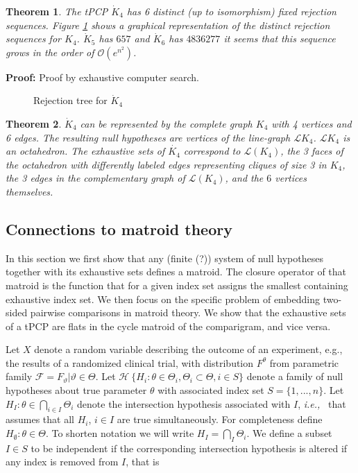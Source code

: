 \documentclass[a4paper,12pt]{article}
\newtheorem{theorem}{Theorem}
\newenvironment{proof}[1][Proof]{\noindent\textbf{#1:} }{}
\newcommand{\ie}{{\em i.e.,}~}
\begin{document}
\begin{theorem}
  The tPCP $\dot{K}_4$ has 6 distinct (up to isomorphism) fixed
  rejection sequences. Figure \ref{fig:k4} shows a graphical
  representation of the distinct rejection sequences for
  $K_4$. $\dot{K}_5$ has $657$ and $\dot{K}_6$ has $4836277$ it seems
  that this sequence grows in the order of $\mathcal{O}(e^{n^2})$.
\end{theorem}

\begin{proof}
  Proof by exhaustive computer search.
\end{proof}

\begin{figure}

  \caption{Rejection tree for $\dot{K}_4$}
  \label{fig:k4}
\end{figure}

\begin{theorem}
  $\dot{K}_4$ can be represented by the complete graph $K_4$ with 4
  vertices and 6 edges. The resulting null hypotheses are vertices of
  the line-graph $\mathcal{L}{K_4}$. $\mathcal{L}{K_4}$ is an
  octahedron. The exhaustive sets of $\dot{K_4}$ correspond to
  $\mathcal{L}(K_4)$, the 3 faces of the octahedron with differently
  labeled edges representing cliques of size 3 in $K_4$, the 3 edges
  in the complementary graph of $\mathcal{L}(K_4)$, and the $6$
  vertices themselves.
\end{theorem}


\subsection{Connections to matroid theory}

In this section we first show that any (finite (?)) system of null
hypotheses together with its exhaustive sets defines a matroid. The
closure operator of that matroid is the function that for a given
index set assigns the smallest containing exhaustive index set. We
then focus on the specific problem of embedding two-sided pairwise
comparisons in matroid theory. We show that the exhaustive sets of a
tPCP are flats in the cycle matroid of the comparigram, and vice
versa. 


Let $X$ denote a random variable describing the outcome of an
experiment, e.g., the results of a randomized clinical trial, with
distribution $F^\theta$ from parametric family $\mathcal{F} =
{F_\vartheta|\vartheta \in \Theta}$. Let $\mathcal{H} \ \{H_i: \theta
\in \Theta_i, \Theta_i \subset \Theta, i \in S\}$ denote a family of
null hypotheses about true parameter $\theta$ with associated index
set $S = \{1,...,n\}$. Let $H_I : \theta \in \bigcap_{i \in I}
\Theta_i$ denote the intersection hypothesis associated with $I$, \ie
that assumes that all $H_i$, $i \in I$ are true simultaneously. For
completeness define $H_\emptyset : \theta \in \Theta$. To shorten
notation we will write $H_I = \bigcap_I \Theta_i$. We define a subset
$I \in S$ to be independent if the corresponding intersection
hypothesis is altered if any index is removed from $I$, that is
\end{document}
